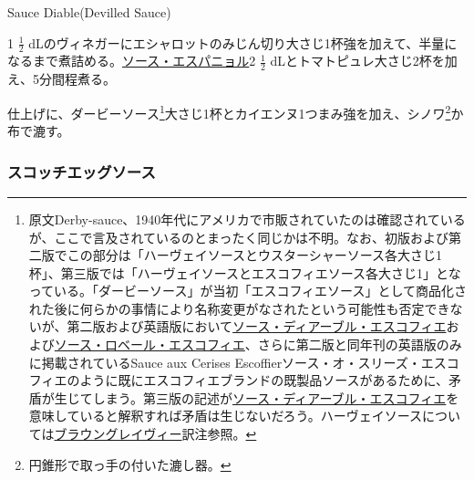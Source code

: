 \begin{recette}
\begin{frsubenv}

Sauce Diable\hspace{1em}\normalfont(Devilled Sauce)

\end{frsubenv}


1 \(\frac{1}{2}\)
dLのヴィネガーにエシャロットのみじん切り大さじ1杯強を加えて、半量になるまで煮詰める。\protect\hyperlink{sauce-espagnole}{ソース・エスパニョル}2
\(\frac{1}{2}\) dLとトマトピュレ大さじ2杯を加え、5分間程煮る。

仕上げに、ダービーソース\footnote{原文Derby-sauce、1940年代にアメリカで市販されていたのは確認されているが、ここで言及されているのとまったく同じかは不明。なお、初版および第二版でこの部分は「ハーヴェイソースとウスターシャーソース各大さじ1杯」、第三版では「ハーヴェイソースとエスコフィエソース各大さじ1」となっている。「ダービーソース」が当初「エスコフィエソース」として商品化された後に何らかの事情により名称変更がなされたという可能性も否定できないが、第二版および英語版において\protect\hyperlink{sauce-diable-escoffier}{ソース・ディアーブル・エスコフィエ}および\protect\hyperlink{sauce-robert-escoffier}{ソース・ロベール・エスコフィエ}、さらに第二版と同年刊の英語版のみに掲載されているSauce
  aux Cerises
  Escoffierソース・オ・スリーズ・エスコフィエのように既にエスコフィエブランドの既製品ソースがあるために、矛盾が生じてしまう。第三版の記述が\protect\hyperlink{sauce-diable-escoffier}{ソース・ディアーブル・エスコフィエ}を意味していると解釈すれば矛盾は生じないだろう。ハーヴェイソースについては\protect\hyperlink{brown-gravy}{ブラウングレイヴィー}訳注参照。}大さじ1杯とカイエンヌ1つまみ強を加え、シノワ\footnote{円錐形で取っ手の付いた漉し器。}か布で漉す。

\atoaki{}

\hypertarget{scotch-eggs-sauce}{%
\subsubsection{スコッチエッグソース}\label{scotch-eggs-sauce}}


\end{recette}
